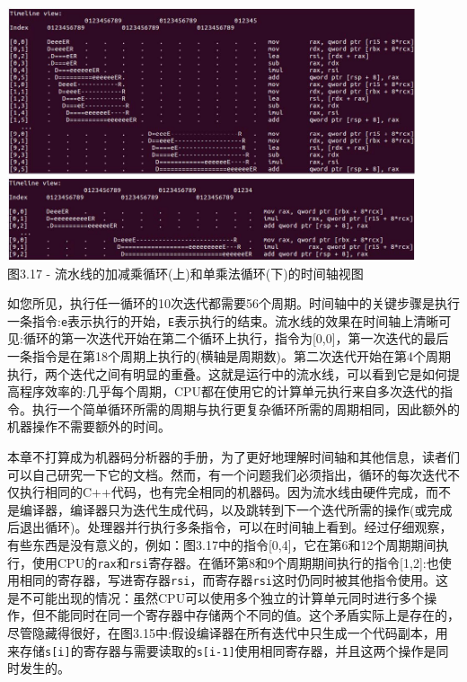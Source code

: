 \begin{center}
\includegraphics[width=0.9\textwidth]{content/1/chapter3/images/17.jpg}\\
图3.17 - 流水线的加减乘循环(上)和单乘法循环(下)的时间轴视图
\end{center}

如您所见，执行任一循环的10次迭代都需要56个周期。时间轴中的关键步骤是执行一条指令:\texttt{e}表示执行的开始，\texttt{E}表示执行的结束。流水线的效果在时间轴上清晰可见:循环的第一次迭代开始在第二个循环上执行，指令为[0,0]，第一次迭代的最后一条指令是在第18个周期上执行的(横轴是周期数)。第二次迭代开始在第4个周期执行，两个迭代之间有明显的重叠。这就是运行中的流水线，可以看到它是如何提高程序效率的:几乎每个周期，CPU都在使用它的计算单元执行来自多次迭代的指令。执行一个简单循环所需的周期与执行更复杂循环所需的周期相同，因此额外的机器操作不需要额外的时间。

本章不打算成为机器码分析器的手册，为了更好地理解时间轴和其他信息，读者们可以自己研究一下它的文档。然而，有一个问题我们必须指出，循环的每次迭代不仅执行相同的C++代码，也有完全相同的机器码。因为流水线由硬件完成，而不是编译器，编译器只为迭代生成代码，以及跳转到下一个迭代所需的操作(或完成后退出循环)。处理器并行执行多条指令，可以在时间轴上看到。经过仔细观察，有些东西是没有意义的，例如：图3.17中的指令[0,4]，它在第6和12个周期期间执行，使用CPU的\texttt{rax}和\texttt{rsi}寄存器。在循环第8和9个周期期间执行的指令[1,2]:也使用相同的寄存器，写进寄存器\texttt{rsi}，而寄存器\texttt{rsi}这时仍同时被其他指令使用。这是不可能出现的情况：虽然CPU可以使用多个独立的计算单元同时进行多个操作，但不能同时在同一个寄存器中存储两个不同的值。这个矛盾实际上是存在的，尽管隐藏得很好，在图3.15中:假设编译器在所有迭代中只生成一个代码副本，用来存储\texttt{s[i]}的寄存器与需要读取的\texttt{s[i-1]}使用相同寄存器，并且这两个操作是同时发生的。

